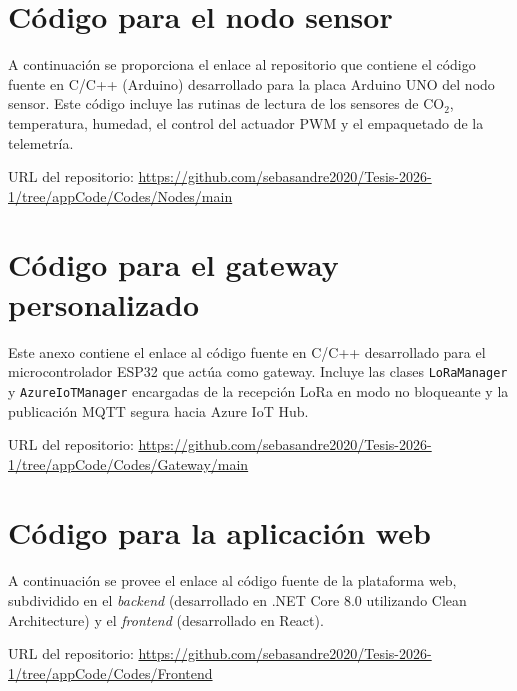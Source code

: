 \chapter{Código para el nodo sensor}
\label{anexo:codigo_nodo}
A continuación se proporciona el enlace al repositorio que contiene el código fuente en C/C++ (Arduino) desarrollado para la placa Arduino UNO del nodo sensor. Este código incluye las rutinas de lectura de los sensores de CO\(_2\), temperatura, humedad, el control del actuador PWM y el empaquetado de la telemetría.

\begin{center}
    URL del repositorio: \href{https://github.com/sebasandre2020/Tesis-2026-1/tree/appCode/Codes/Nodes/main}{https://github.com/sebasandre2020/Tesis-2026-1/tree/appCode/Codes/Nodes/main}
\end{center}

\chapter{Código para el gateway personalizado}
\label{anexo:codigo_gateway}
Este anexo contiene el enlace al código fuente en C/C++ desarrollado para el microcontrolador ESP32 que actúa como gateway. Incluye las clases \texttt{LoRaManager} y \texttt{AzureIoTManager} encargadas de la recepción LoRa en modo no bloqueante y la publicación MQTT segura hacia Azure IoT Hub.

\begin{center}
    URL del repositorio: \href{https://github.com/sebasandre2020/Tesis-2026-1/tree/appCode/Codes/Gateway/main}{https://github.com/sebasandre2020/Tesis-2026-1/tree/appCode/Codes/Gateway/main}
\end{center}

\chapter{Código para la aplicación web}
\label{anexo:codigo_web}
A continuación se provee el enlace al código fuente de la plataforma web, subdividido en el \textit{backend} (desarrollado en .NET Core 8.0 utilizando Clean Architecture) y el \textit{frontend} (desarrollado en React).

\begin{center}
    URL del repositorio: \href{https://github.com/sebasandre2020/Tesis-2026-1/tree/appCode/Codes/Frontend}{https://github.com/sebasandre2020/Tesis-2026-1/tree/appCode/Codes/Frontend}
\end{center}

